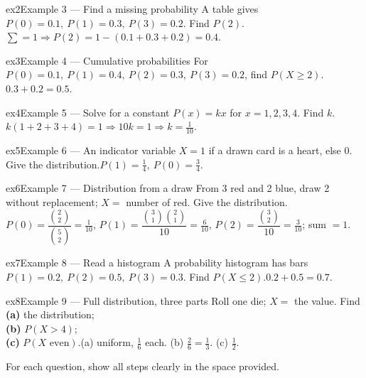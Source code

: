 \documentclass[11pt]{article}
\begin{document}
\begin{example}{ex2}{Example 3 --- Find a missing probability}
A table gives $P(0)=0.1,\ P(1)=0.3,\ P(3)=0.2$. Find $P(2)$.\soln $\sum=1\Rightarrow P(2)=1-(0.1+0.3+0.2)=0.4$.
\end{example}

\begin{example}{ex3}{Example 4 --- Cumulative probabilities}
For $P(0)=0.1,\ P(1)=0.4,\ P(2)=0.3,\ P(3)=0.2$, find $P(X\ge2)$.\soln $0.3+0.2=0.5$.
\end{example}

\begin{example}{ex4}{Example 5 --- Solve for a constant}
$P(x)=kx$ for $x=1,2,3,4$. Find $k$.\soln $k(1+2+3+4)=1\Rightarrow 10k=1\Rightarrow k=\tfrac{1}{10}$.
\end{example}

\begin{example}{ex5}{Example 6 --- An indicator variable}
$X=1$ if a drawn card is a heart, else $0$. Give the distribution.\soln $P(1)=\tfrac14,\ P(0)=\tfrac34$.
\end{example}

\begin{example}{ex6}{Example 7 --- Distribution from a draw}
From 3 red and 2 blue, draw 2 without replacement; $X=$ number of red. Give the distribution.\soln $P(0)=\dfrac{\binom{2}{2}}{\binom{5}{2}}=\tfrac{1}{10}$, $P(1)=\dfrac{\binom{3}{1}\binom{2}{1}}{10}=\tfrac{6}{10}$, $P(2)=\dfrac{\binom{3}{2}}{10}=\tfrac{3}{10}$; sum $=1$. \checkmark
\end{example}

\begin{example}{ex7}{Example 8 --- Read a histogram}
A probability histogram has bars $P(1)=0.2,\ P(2)=0.5,\ P(3)=0.3$. Find $P(X\le2)$.\soln $0.2+0.5=0.7$.
\end{example}

\begin{example}{ex8}{Example 9 --- Full distribution, three parts}
Roll one die; $X=$ the value. Find \\ \textbf{(a)} the distribution; \\ \textbf{(b)} $P(X>4)$; \\ \textbf{(c)} $P(X\text{ even})$.\soln (a) uniform, $\tfrac16$ each. (b) $\tfrac26=\tfrac13$. (c) $\tfrac12$.
\end{example}

\clearpage
{}
For each question, show all steps clearly in the space provided.
\end{document}

